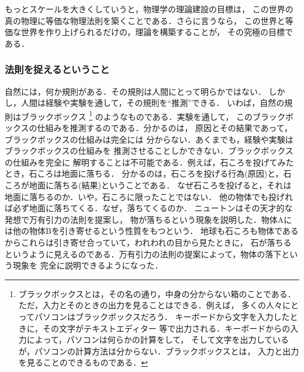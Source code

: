                 もっとスケールを大きくしていうと，物理学の理論建設の目標は，
                この世界の真の物理に等価な物理法則を築くことである．さらに言うなら，
                この世界と等価な世界を作り上げられるだけの，理論を構築することが，
                その究極の目標である．

            \subsubsection{法則を捉えるということ}
            自然には，何か規則がある．その規則は人間にとって明らかではない．
            しかし，人間は経験や実験を通して，その規則を“推測”できる．
            いわば，自然の規則はブラックボックス
                \footnote{
                    ブラックボックスとは，その名の通り，中身の分からない箱のことである．
                    ただ，入力とそのときの出力を見ることはできる．例えば，
                    多くの人々にとってパソコンはブラックボックスだろう．
                    キーボードから文字を入力したときに，その文字がテキストエディター
                    等で出力される．キーボードからの入力によって，パソコンは何らかの計算をして，
                    そして文字を出力しているが，パソコンの計算方法は分からない．ブラックボックスとは，
                    入力と出力を見ることのできるものである．
                }
            のようなものである．実験を通して，
            このブラックボックスの仕組みを推測するのである．分かるのは，
            原因とその結果であって，ブラックボックスの仕組みは完全には
            分からない．あくまでも，経験や実験はブラックボックスの仕組みを
            推測させることしかできない．ブラックボックスの仕組みを完全に
            解明することは不可能である．例えば，石ころを投げてみたとき，石ころは地面に落ちる．
            分かるのは，石ころを投げる行為(原因)と，石ころが地面に落ちる(結果)ということである．
            なぜ石ころを投げると，それは地面に落ちるのか．いや，石ころに限ったことではない．
            他の物体でも投げれば必ず地面に落ちてくる．なぜ，落ちてくるのか．
            ニュートンはその天才的な発想で万有引力の法則を提案し，
            物が落ちるという現象を説明した．物体Aには他の物体Bを引き寄せるという性質をもつという．
            地球も石ころも物体であるからこれらは引き寄せ合っていて，われわれの目から見たときに，
            石が落ちるというように見えるのである．万有引力の法則の提案によって，物体の落下という現象を
            完全に説明できるようになった．

